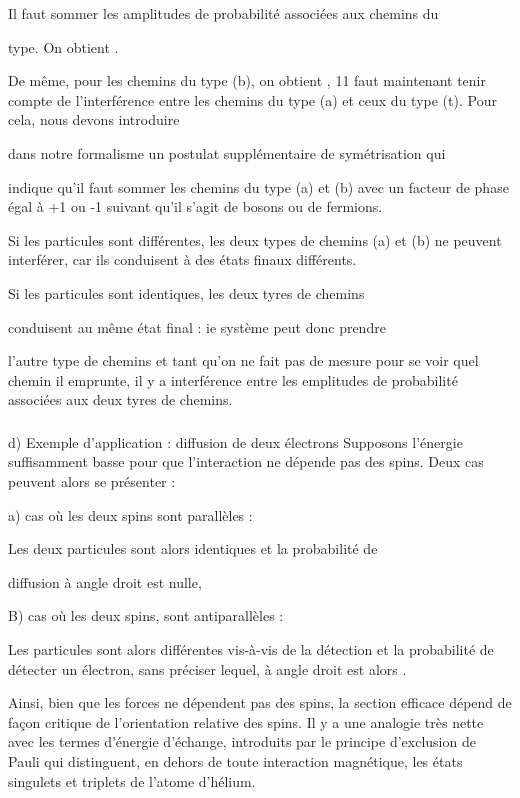 {{{Il faut sommer les amplitudes de probabilité associées aux chemins du

type.  On obtient .


De même, pour les chemins du type (b), on obtient ,
11 faut maintenant tenir compte de l'interférence entre les chemins
du type (a) et ceux du type (t). Pour cela, nous devons introduire

dans notre formalisme un postulat supplémentaire de symétrisation qui

indique qu'il faut sommer les chemins du type (a) et (b) avec un facteur de
phase égal à +1 ou -1 suivant qu'il s'agit de bosons ou de
fermions.

Si les particules sont différentes, les deux types de chemins (a) et (b)
ne peuvent interférer, car ils conduisent à des états
finaux différents.

Si les particules sont identiques, les deux tyres de chemins

conduisent au même état final : ie système peut donc prendre

l'autre type de chemins et tant qu'on ne fait pas de mesure pour se
voir quel chemin il emprunte, il y a interférence entre les emplitudes
de probabilité associées aux deux tyres de chemins.
\subsubsection{}%
d) Exemple d'application : diffusion de deux électrons
Supposons l'énergie suffisamment basse pour que l'interaction ne
dépende pas des spins. Deux cas peuvent alors se présenter :

a) cas où les deux spins sont parallèles :

Les deux particules sont alors identiques et la probabilité de

diffusion à angle droit est nulle,


B) cas où les deux spins, sont antiparallèles :

Les particules sont alors différentes vis-à-vis de la
détection et la probabilité de détecter un électron, sans préciser
lequel, à angle droit est alors .

Ainsi, bien que les forces ne dépendent pas des spins, la section
efficace dépend de façon critique de l'orientation relative des
spins. Il y a une analogie très nette avec les termes d'énergie
d'échange, introduits par le principe d'exclusion de Pauli qui
distinguent, en dehors de toute interaction magnétique, les états
singulets et triplets de l'atome d'hélium.

}}}
